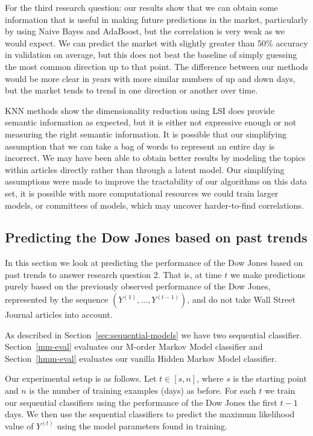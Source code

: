 \documentclass[10pt, twocolumn]{article}
\begin{document}
For the third research question: our results show that we can obtain some information that is useful in making future predictions in the market, particularly by using Naive Bayes and AdaBoost, but the correlation is very weak as we would expect. We can predict the market with slightly greater than 50\% accuracy in validation on average, but this does not beat the baseline of simply guessing the most common direction up to that point. The difference between our methods would be more clear in years with more similar numbers of up and down days, but the market tends to trend in one direction or another over time. 

KNN methods show the dimensionality reduction using LSI does provide semantic information as expected, but it is either not expressive enough or not measuring the right semantic information. It is possible that our simplifying assumption that we can take a bag of words to represent an entire day is incorrect. We may have been able to obtain better results by modeling the topics within articles directly rather than through a latent model. Our simplifying assumptions were made to improve the tractability of our algorithms on this data set, it is possible with more computational resources we could train larger models, or committees of models, which may uncover harder-to-find correlations.

\subsection{Predicting the Dow Jones based on past trends}
\label{dj->dj}

In this section we look at predicting the performance of the Dow Jones based on past trends to answer research question 2.
That is, at time $t$ we make predictions purely based on the previously observed performance of the Dow Jones, represented by the sequence $(Y^{(1)}, ..., Y^{(t-1)})$, and do not take Wall Street Journal articles into account.

As described in Section~\ref{sec:sequential-models} we have two sequential classifier.
Section~\ref{mm-eval} evaluates our M-order Markov Model classifier and Section~\ref{hmm-eval} evaluates our vanilla Hidden Markov Model classifier.

Our experimental setup is as follows.
Let $t\in{}[s,n]$, where $s$ is the starting point and $n$ is the number of training examples (days) as before.
For each $t$ we train our sequential classifiers using the performance of the Dow Jones the first $t-1$ days.
We then use the sequential classifiers to predict the maximum likelihood value of $Y^{(t)}$ using the model parameters found in training.
\end{document}
